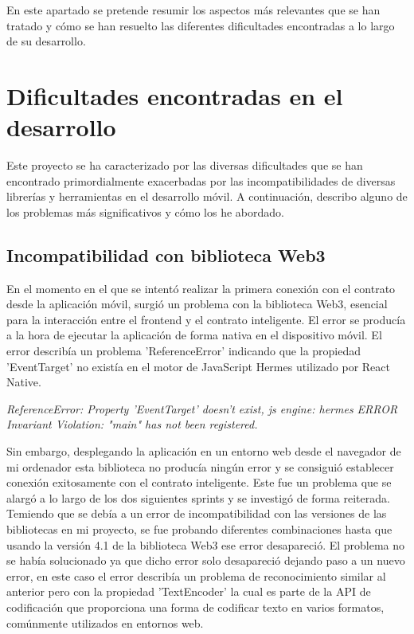 
En este apartado se pretende resumir los aspectos más relevantes que se han tratado y cómo se han resuelto las diferentes dificultades encontradas a lo largo de su desarrollo.



\section{Dificultades encontradas en el desarrollo}

Este proyecto se ha caracterizado por las diversas dificultades que se han encontrado primordialmente exacerbadas por las incompatibilidades de diversas librerías y herramientas en el desarrollo móvil.
A continuación, describo alguno de los problemas más significativos y cómo los he abordado.

\subsection{Incompatibilidad con biblioteca Web3}

En el momento en el que se intentó realizar la primera conexión con el contrato desde la aplicación móvil, surgió un problema con la biblioteca Web3, esencial para la interacción entre el frontend y el contrato inteligente.
El error se producía a la hora de ejecutar la aplicación de forma nativa en el dispositivo móvil.
El error describía un problema 'ReferenceError' indicando que la propiedad 'EventTarget' no existía en el motor de JavaScript Hermes utilizado por React Native. 

\textit{ReferenceError: Property 'EventTarget' doesn't exist, js engine: hermes ERROR Invariant Violation: "main" has not been registered.}

Sin embargo, desplegando la aplicación en un entorno web desde el navegador de mi ordenador esta biblioteca no producía ningún error y se consiguió establecer conexión exitosamente con el contrato inteligente.
Este fue un problema que se alargó a lo largo de los dos siguientes sprints y se investigó de forma reiterada. Temiendo que se debía a un error de incompatibilidad con las versiones de las bibliotecas en mi proyecto, se fue probando diferentes combinaciones hasta que usando la versión 4.1 de la biblioteca Web3 ese error desapareció.
El problema no se había solucionado ya que dicho error solo desapareció dejando paso a un nuevo error, en este caso el error describía un problema de reconocimiento similar al anterior pero con la propiedad 'TextEncoder' la cual es parte de la API de codificación que proporciona una forma de codificar texto en varios formatos, comúnmente utilizados en entornos web.

